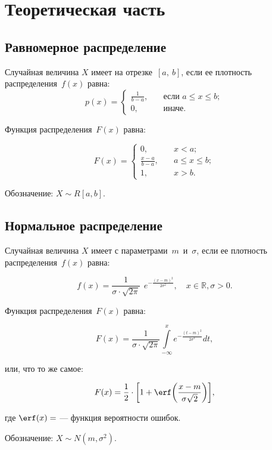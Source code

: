 \chapter{Теоретическая часть}

\section{Равномерное распределение}

Случайная величина $X$ имеет  на
отрезке~$[a,~b]$, если ее плотность распределения~$f(x)$ равна:
\begin{equation}
    p(x) =
    \begin{cases}
        \displaystyle\frac{1}{b - a}, & \quad \text{если } a \leq x \leq b;\\
        0,  & \quad \text{иначе}.
    \end{cases}
\end{equation}

Функция распределения~$F(x)$ равна:

\begin{equation}
    F(x) =
    \begin{cases}
        0,  & \quad x < a;\\
        \displaystyle\frac{x - a}{b - a}, & \quad a \leq x \leq b;\\
        1,  & \quad x > b.
    \end{cases}
\end{equation}

Обозначение: $X \sim R[a, b]$.

\section{Нормальное распределение}

Случайная величина $X$ имеет  с
параметрами~$m$~и~$\sigma$, если ее плотность распределения~$f(x)$ равна:

\begin{equation}
    f(x) = \frac{1}{\sigma \cdot \sqrt{2\pi}}~~e^{\displaystyle-\frac{(x -
    m)^2}{2\sigma^2}}, \quad x \in \mathbb{R}, \sigma > 0.
\end{equation}

Функция распределения~$F(x)$ равна:

\begin{equation}
    F(x) = \frac{1}{\sigma \cdot \sqrt{2\pi}} \int\limits_{-\infty}^{x}
    e^{\displaystyle-\frac{(t - m)^2}{2\sigma^2}} dt,
\end{equation}

или, что то же самое:

\begin{equation}
    F(x) = \frac{1}{2} \cdot \bigg[1 + \erf\bigg(\frac{x - m}{\sigma
    \sqrt{2}}\bigg)\bigg],
\end{equation}

где $\erf(x) = $ 
 --- функция вероятности
ошибок.

Обозначение: $X \sim N(m, \sigma^2)$.
